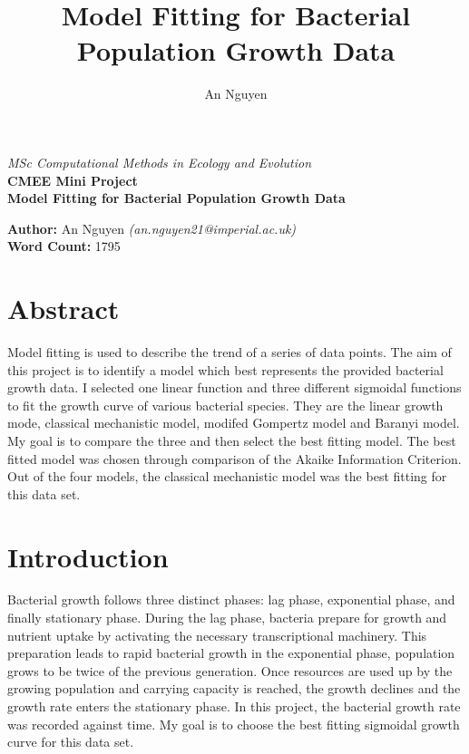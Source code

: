 \documentclass[11pt]{article}
\title{Model Fitting for Bacterial Population Growth Data}
\author{An Nguyen}
\begin{document}
\begin{titlepage}

        \centering
		\vspace*{2cm}
		\Large
		\emph{MSc Computational Methods in Ecology and Evolution}\\
		\vspace*{1cm}
		\Large
		\textbf{CMEE Mini Project}\\
		
		\vspace*{3cm}
		\Huge
		\textbf{Model Fitting for Bacterial Population Growth Data}\\
		
		\vspace{3cm}
		\Large
		
		\textbf{Author:} An Nguyen \textit{(an.nguyen21@imperial.ac.uk)}\\
		\vspace*{1cm}
		\textbf{Word Count:} 1795

	\end{titlepage}
\newpage
\tableofcontents
\newpage
{}
\section*{Abstract}
Model fitting is used to describe the trend of a series of data points.  The aim of this project is to identify a model which best represents the provided bacterial growth data. I selected one linear function and three different sigmoidal functions to fit the growth curve of various bacterial species. They are the linear growth mode, classical mechanistic model, modifed Gompertz model and Baranyi model. My goal is to compare the three and then select the best fitting model. The best fitted model was chosen through comparison of the Akaike Information Criterion. Out of the four models, the classical mechanistic model was the best fitting for this data set. 

\newpage
\section{Introduction}

Bacterial growth follows three distinct phases: lag phase, exponential phase, and finally stationary phase. During the lag phase, bacteria prepare for growth and nutrient uptake by activating the necessary transcriptional machinery. This preparation leads to rapid bacterial growth in the exponential phase, population grows to be twice of the previous generation. Once resources are used up by the growing population and carrying capacity is reached, the growth declines and the growth rate enters the stationary phase. In this project, the bacterial growth rate was recorded against time. My goal is to choose the best fitting sigmoidal growth curve for this data set. 
\end{document}

